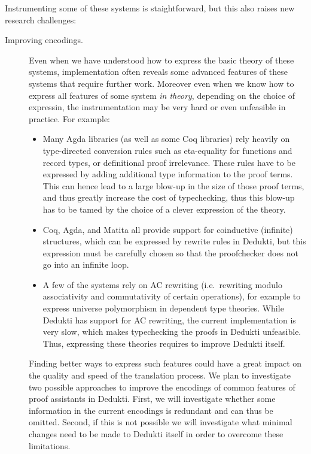 Instrumenting some of these systems is staightforward, but this also
raises new research challenges:
\begin{description}

\item[Improving encodings.] Even when we have understood how to express
  the basic theory of these systems, implementation often reveals some
  advanced features of these systems that require further work.
  Moreover even when we know how to express all features of some
  system \emph{in theory}, depending on the choice of expressin, the
  instrumentation may be very hard or even unfeasible in practice. For
  example:
  \begin{itemize}

    \item Many Agda libraries (as well as some Coq libraries) rely
    heavily on type-directed conversion rules such as eta-equality for
    functions and record types, or definitional proof
    irrelevance. These rules have to be expressed by adding
    additional type information to the proof terms. This can hence
    lead to a large blow-up in the size of those proof terms, and thus
    greatly increase the cost of typechecking, thus this blow-up has to
    be tamed by the choice of a clever expression of the theory.

    \item Coq, Agda, and Matita all provide support for coinductive
      (infinite) structures, which can be expressed by rewrite rules
      in Dedukti, but this expression must be carefully chosen so that
      the proofchecker does not go into an infinite loop.

    \item A few of the systems rely on AC rewriting (i.e.~rewriting
    modulo associativity and commutativity of certain operations), for
    example to express universe polymorphism in dependent type
    theories. While Dedukti has support for AC rewriting, the current
    implementation is very slow, which makes typechecking the proofs
    in Dedukti unfeasible. Thus, expressing these theories requires
    to improve Dedukti itself.

  \end{itemize}
  Finding better ways to express such features could have a great
  impact on the quality and speed of the translation process.  We plan
  to investigate two possible approaches to improve the encodings of
  common features of proof assistants in Dedukti. First, we will
  investigate whether some information in the current encodings is
  redundant and can thus be omitted. Second, if this is not possible
  we will investigate what minimal changes need to be made to Dedukti
  itself in order to overcome these limitations.


\end{description}
